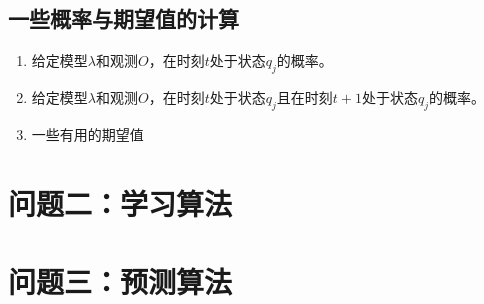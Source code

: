 \subsection*{一些概率与期望值的计算}
\begin{enumerate}
	\item 给定模型$\lambda$和观测$O$，在时刻$t$处于状态$q_j$的概率。
	\item 给定模型$\lambda$和观测$O$，在时刻$t$处于状态$q_j$且在时刻$t+1$处于状态$q_j$的概率。
	\item 一些有用的期望值
\end{enumerate}
\section*{问题二：学习算法}
\section*{问题三：预测算法}
